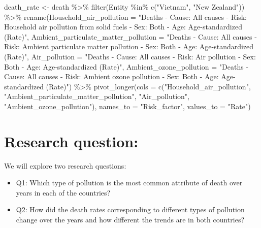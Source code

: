 \documentclass[11pt,a4paper,]{article}
\newenvironment{Shaded}{\begin{snugshade}}{\end{snugshade}}
\newcommand{\AttributeTok}[1]{\textcolor[rgb]{0.77,0.63,0.00}{#1}}
\newcommand{\FunctionTok}[1]{\textcolor[rgb]{0.00,0.00,0.00}{#1}}
\newcommand{\NormalTok}[1]{#1}
\newcommand{\OtherTok}[1]{\textcolor[rgb]{0.56,0.35,0.01}{#1}}
\newcommand{\SpecialCharTok}[1]{\textcolor[rgb]{0.00,0.00,0.00}{#1}}
\newcommand{\StringTok}[1]{\textcolor[rgb]{0.31,0.60,0.02}{#1}}
\begin{document}
\begin{Shaded}
\begin{Highlighting}[]
\NormalTok{death\_rate }\OtherTok{\textless{}{-}}\NormalTok{ death }\SpecialCharTok{\%\textgreater{}\%}
  \FunctionTok{filter}\NormalTok{(Entity }\SpecialCharTok{\%in\%} \FunctionTok{c}\NormalTok{(}\StringTok{"Vietnam"}\NormalTok{, }\StringTok{"New Zealand"}\NormalTok{)) }\SpecialCharTok{\%\textgreater{}\%}
  \FunctionTok{rename}\NormalTok{(}\AttributeTok{Household\_air\_pollution =} \StringTok{"Deaths {-} Cause: All causes {-} Risk: Household air pollution from solid fuels {-} Sex: Both {-} Age: Age{-}standardized (Rate)"}\NormalTok{,}
         \AttributeTok{Ambient\_particulate\_matter\_pollution =} \StringTok{"Deaths {-} Cause: All causes {-} Risk: Ambient particulate matter pollution {-} Sex: Both {-} Age: Age{-}standardized (Rate)"}\NormalTok{,}
         \AttributeTok{Air\_pollution =} \StringTok{"Deaths {-} Cause: All causes {-} Risk: Air pollution {-} Sex: Both {-} Age: Age{-}standardized (Rate)"}\NormalTok{,}
         \AttributeTok{Ambient\_ozone\_pollution =} \StringTok{"Deaths {-} Cause: All causes {-} Risk: Ambient ozone pollution {-} Sex: Both {-} Age: Age{-}standardized (Rate)"}\NormalTok{) }\SpecialCharTok{\%\textgreater{}\%}
  \FunctionTok{pivot\_longer}\NormalTok{(}\AttributeTok{cols =} \FunctionTok{c}\NormalTok{(}\StringTok{"Household\_air\_pollution"}\NormalTok{,}
               \StringTok{"Ambient\_particulate\_matter\_pollution"}\NormalTok{,}
               \StringTok{"Air\_pollution"}\NormalTok{, }
               \StringTok{"Ambient\_ozone\_pollution"}\NormalTok{),}
               \AttributeTok{names\_to =} \StringTok{"Risk\_factor"}\NormalTok{,}
               \AttributeTok{values\_to =} \StringTok{"Rate"}\NormalTok{)}
\end{Highlighting}
\end{Shaded}

\hypertarget{research-question}{%
\section{Research question:}\label{research-question}}

We will explore two research questions:

\begin{itemize}
\item
  Q1: Which type of pollution is the most common attribute of death over years in each of the countries?
\item
  Q2: How did the death rates corresponding to different types of pollution change over the years and how different the trends are in both countries?
\end{itemize}
\end{document}
